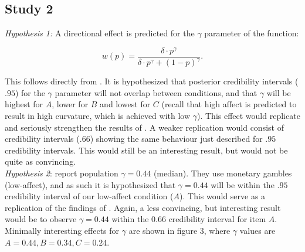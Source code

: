\documentclass[12pt]{article}
\begin{document}
\subsection{Study 2}
\emph{Hypothesis 1:} A directional effect is
predicted for the $\gamma$ parameter of the function:

\[
	w(p) = \frac{\delta \cdot p^{\gamma}}
	{\delta \cdot p^{\gamma}+(1-p)^{\gamma}}
.\]

This follows directly from \textcite{
rottenstreich2001money}.
It is hypothesized that
posterior credibility intervals ($.95$)
for the $\gamma$
parameter will not overlap between
conditions, and that $\gamma$ will be highest for
$A$, lower for  $B$ and lowest for  $C$
(recall that high affect is predicted to
result in high curvature, which is achieved
with low $\gamma$). This effect would replicate
and seriously strengthen the results of
\textcite{rottenstreich2001money}. A
weaker replication would consist of
credibility intervals ($.66$) showing the
same behaviour just described for $.95$
credibility intervals. This would still be an
interesting result, but would not be
quite as convincing. \\

\emph{Hypothesis 2}: \textcite{gonzalez1999shape} report
population $\gamma = 0.44$ (median).
They use monetary gambles (low-affect),
and as such it is hypothesized that
$\gamma = 0.44$ will be within the  $.95$
credibility interval of our low-affect
condition ($A$). This would serve as
a replication of the findings of
\textcite{gonzalez1999shape}. Again, a
less convincing, but interesting result would
be to observe $\gamma = 0.44$ within the
$0.66$ credibility interval for item $A$. Minimally
interesting effects for $\gamma$ are
shown in figure 3, where  $\gamma$
values are  $A = 0.44, B = 0.34, C = 0.24$.
\end{document}
